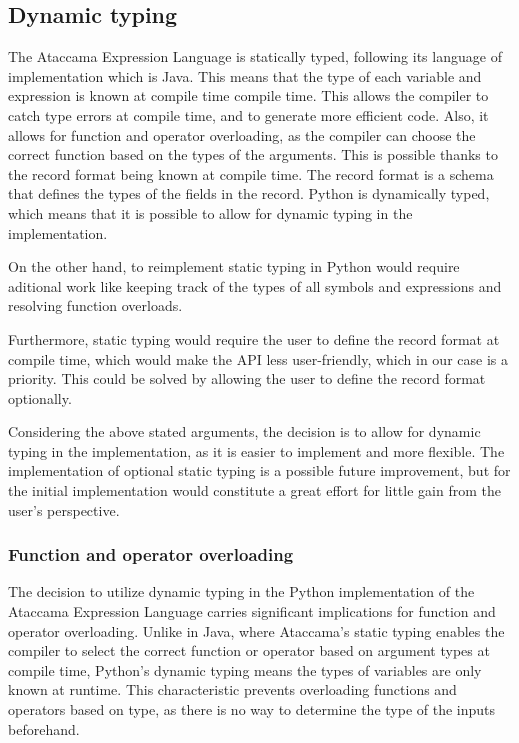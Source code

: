 \subsection{Dynamic typing}

The Ataccama Expression Language is statically typed, following its language
of implementation which is Java. This means that the type of each variable and
expression is known at compile time compile time. This allows the compiler to
catch type errors at compile time, and to generate more efficient code. Also,
it allows for function and operator overloading, as the compiler can choose the
correct function based on the types of the arguments.
This is possible thanks to the record format being known at compile time. The
record format is a schema that defines the types of the fields in the record.
Python is dynamically typed, which means that it is possible to allow for
dynamic typing in the implementation.

On the other hand, to reimplement static typing in Python would require
aditional work like keeping track of the types of all symbols and expressions and
resolving function overloads.

Furthermore, static typing would require the user to define the record format
at compile time, which would make the API less user-friendly, which in our case
is a priority. This could be solved by allowing the user to define the record format optionally.

Considering the above stated arguments, the decision is to allow for dynamic
typing in the implementation, as it is easier to implement and more flexible. 
The implementation of optional static typing is a possible future improvement, but for the initial implementation would
constitute a great effort for little gain from the user's perspective.

\subsubsection{Function and operator overloading}

The decision to utilize dynamic typing in the Python implementation of the Ataccama Expression Language carries significant implications for function and operator overloading. Unlike in Java, where Ataccama's static typing enables the compiler to select the correct function or operator based on argument types at compile time, Python's dynamic typing means the types of variables are only known at runtime. This characteristic prevents overloading functions and operators based on type, as there is no way to determine the type of the inputs beforehand.

